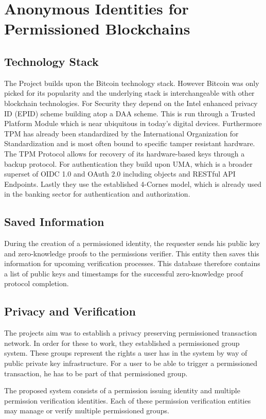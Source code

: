 \section{Anonymous Identities for Permissioned Blockchains}

\subsection{Technology Stack}
The Project builds upon the Bitcoin technology stack. However Bitcoin was only picked for its popularity and the underlying stack is interchangeable with other blockchain technologies. For Security they depend on the Intel enhanced privacy ID (EPID) scheme building atop a DAA scheme. This is run through a Trusted Platform Module which is near ubiquitous in today's digital devices. Furthermore TPM has already been standardized by the International Organization for Standardization and is most often bound to specific tamper resistant hardware. The TPM Protocol allows for recovery of its hardware-based keys through a backup protocol.
For authentication they build upon UMA, which is a broader superset of OIDC 1.0 and OAuth 2.0 including objects and RESTful API Endpoints.
Lastly they use the established 4-Cornes model, which is already used in the banking sector for authentication and authorization.

\subsection{Saved Information}
During the creation of a permissioned identity, the requester sends his public key and zero-knowledge proofs to the permissions verifier. This entity then saves this information for upcoming verification processes. This database therefore contains a list of public keys and timestamps for the successful zero-knowledge proof protocol completion.

\subsection{Privacy and Verification}
The projects aim was to establish a privacy preserving permissioned transaction network. In order for these to work, they established a permissioned group system. These groups represent the rights a user has in the system by way of public private key infrastructure. For a user to be able to trigger a permissioned transaction, he has to be part of that permissioned group.

The proposed system consists of a permission issuing identity and multiple permission verification identities. Each of these permission verification entities may manage or verify multiple permissioned groups.

